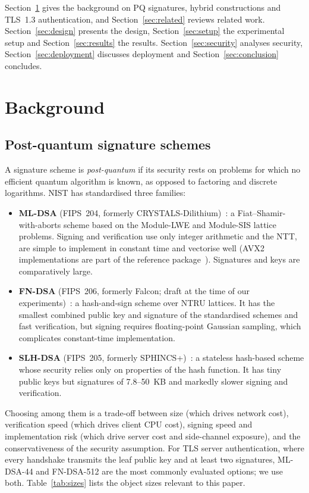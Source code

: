 \documentclass[preprint,10pt,3p]{elsarticle}
\begin{document}
Section~\ref{sec:background} gives the background on PQ signatures, hybrid
constructions and TLS~1.3 authentication, and Section~\ref{sec:related}
reviews related work.  Section~\ref{sec:design} presents the design,
Section~\ref{sec:setup} the experimental setup and Section~\ref{sec:results}
the results.  Section~\ref{sec:security} analyses security,
Section~\ref{sec:deployment} discusses deployment and
Section~\ref{sec:conclusion} concludes.

\section{Background}
\label{sec:background}

\subsection{Post-quantum signature schemes}

A signature scheme is \emph{post-quantum} if its security rests on problems
for which no efficient quantum algorithm is known, as opposed to factoring
and discrete logarithms.  NIST has standardised three families:
\begin{itemize}[leftmargin=*,noitemsep]
\item \textbf{ML-DSA} (FIPS~204, formerly CRYSTALS-Dilithium)~\cite{FIPS204}:
  a Fiat--Shamir-with-aborts scheme based on the Module-LWE and Module-SIS
  lattice problems.  Signing and verification use only integer arithmetic
  and the NTT, are simple to implement in constant time and vectorise well
  (AVX2 implementations are part of the reference
  package~\cite{Ducas2018Dilithium}).  Signatures and keys are
  comparatively large.
\item \textbf{FN-DSA} (FIPS~206, formerly Falcon; draft at the time of our
  experiments)~\cite{FIPS206Draft}: a hash-and-sign scheme over NTRU
  lattices.  It has the smallest combined public key and signature of the
  standardised schemes and fast verification, but signing requires
  floating-point Gaussian sampling, which complicates constant-time
  implementation.
\item \textbf{SLH-DSA} (FIPS~205, formerly SPHINCS+)~\cite{FIPS205}: a
  stateless hash-based scheme whose security relies only on properties of
  the hash function.  It has tiny public keys but signatures of 7.8--50~KB
  and markedly slower signing and verification.
\end{itemize}
Choosing among them is a trade-off between size (which drives network
cost), verification speed (which drives client CPU cost), signing speed
and implementation risk (which drive server cost and side-channel
exposure), and the conservativeness of the security assumption.  For TLS
server authentication, where every handshake transmits the leaf public key
and at least two signatures, ML-DSA-44 and FN-DSA-512 are the most
commonly evaluated options; we use both.  Table~\ref{tab:sizes} lists the
object sizes relevant to this paper.
\end{document}
